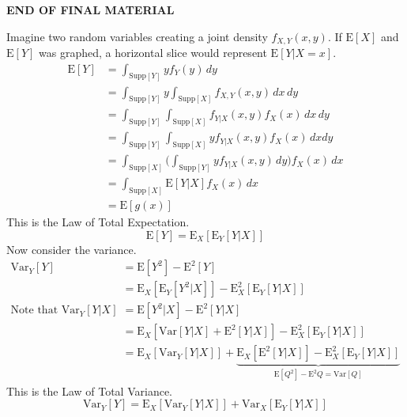 \documentclass[12pt]{article}
\newcommand{\supp}[1]{\text{Supp}[ #1 ]}
\newcommand{\expected}[1]{\mathrm{E}[#1]}
\newcommand{\variance}[1]{\mathrm{Var}[#1]}
\begin{document}
\begin{center}  \textbf{END OF FINAL MATERIAL} \end{center}

Imagine two random variables creating a joint density $f_{X,Y}(x,y)$. If $\expected{X}$ and $\expected{Y}$ was graphed, a horizontal slice would represent $\expected{Y|X = x}$. 
$$ \begin{aligned} \expected{Y} &= \int_{\supp{Y}} yf_Y(y)\, dy \\ &= \int_{\supp{Y}} y \int_{\supp{X}} f_{X,Y}(x,y) \, dx \, dy \\ &= \int_{\supp{Y}} \int_{\supp{X}} f_{Y|X}(x,y) f_X(x) \, dx \, dy \\ &= \int_{\supp{Y}}\int_{\supp{X}} y f_{Y|X}(x,y)f_X(x) \, dxdy \\ &= \int_{\supp{X}} \Bigg( \int_{\supp{Y}} y f_{Y|X}(x,y) \, dy \Bigg) f_X(x) \, dx \\ &= \int_{\supp{X}} \expected{Y|X} f_X(x) \, dx \\ &= \expected{g(x)} \end{aligned} $$ 
This is the Law of Total Expectation. $$ \expected{Y} = \mathrm{E}_X[\mathrm{E}_Y[Y|X]] $$ Now consider the variance. 
$$ \begin{aligned} \mathrm{Var}_Y[Y] &= \expected{Y^2} - \mathrm{E}^2[Y] \\ &= \mathrm{E}_X[ \mathrm{E}_Y[Y^2|X]] - \mathrm{E}_X^2[\mathrm{E}_Y[Y|X]] \\ \text{Note that } \mathrm{Var}_Y[Y|X] &= \mathrm{E}[Y^2|X] - \mathrm{E}^2[Y|X] \\ &= \mathrm{E}_X[\mathrm{Var}[Y|X] + \mathrm{E}^2[Y|X]] - \mathrm{E}_X^2[\mathrm{E}_Y[Y|X]] \\ &= \mathrm{E}_X[\mathrm{Var}_Y[Y|X]] + \underbrace{ \mathrm{E}_X[\mathrm{E}^2[Y|X]] - \mathrm{E}_X^2[\mathrm{E}_Y[Y|X]]}_{\expected{Q^2} - \mathrm{E}^2{Q} = \variance{Q}} \end{aligned} $$ 
This is the Law of Total Variance.
$$ \mathrm{Var}_Y[Y] = \mathrm{E}_X[\mathrm{Var}_Y[Y|X]] + \mathrm{Var}_X[\mathrm{E}_Y[Y|X]] $$ 
\end{document}
